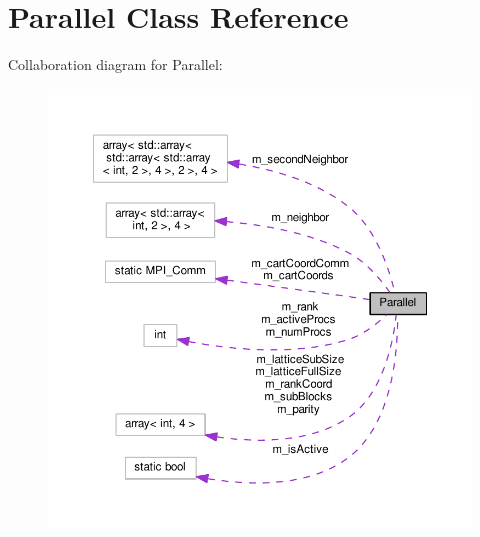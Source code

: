 \hypertarget{classParallel}{}\section{Parallel Class Reference}
\label{classParallel}


Collaboration diagram for Parallel\+:\nopagebreak
\begin{figure}[H]
\begin{center}
\leavevmode
\includegraphics[width=350pt]{d5/d7c/classParallel__coll__graph}
\end{center}
\end{figure}
